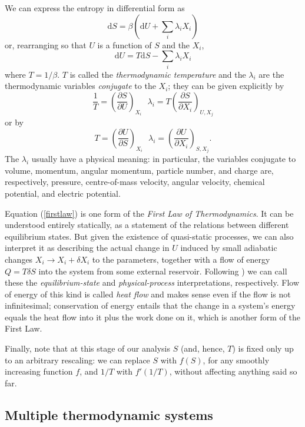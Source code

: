 \documentclass[12pt]{article}
\newcommand{\pbp}[2]{\ensuremath{\frac{\partial #1}{\partial #2}}}
\newcommand{\be}{\begin{equation}}
\newcommand{\ee}{\end{equation}}
\begin{document}
We can express the entropy in differential form as
\be
\mathrm{d}S = \beta\left(\mathrm{d}U + \sum_i \lambda_i X_i \right)
\ee
or, rearranging so that $U$ is a function of $S$ and the $X_i$,
\be\label{firstlaw}
\mathrm{d}U = T \mathrm{d}S - \sum_i \lambda_i X_i
\ee
where $T=1/\beta$. $T$ is called the \emph{thermodynamic temperature} and the $\lambda_i$ are the thermodynamic variables \emph{conjugate} to the $X_i$; they can be given explicitly by
\be
\frac{1}{T} = \left(\pbp{S}{U}\right)_{X_i}\,\,\,\, \lambda_i = T \left(\pbp{S}{X_i}\right)_{U,X_j}
\ee
or by
\be
T = \left(\pbp{U}{S}\right)_{X_i}\,\,\,\, \lambda_i = \left(\pbp{U}{X_i}\right)_{S,X_j}.
\ee
The $\lambda_i$ usually have a physical meaning: in particular, the variables conjugate to volume, momentum, angular momentum, particle number, and charge are, respectively, pressure, centre-of-mass velocity, angular velocity, chemical potential, and electric potential.

Equation (\ref{firstlaw}) is one form of the \emph{First Law of Thermodynamics}. It can be understood entirely statically, as a statement of the relations between different equilibrium states. But given the existence of quasi-static processes, we can also interpret it as describing the actual change in $U$ induced by small adiabatic changes $X_i \rightarrow X_i + \delta X_i$ to the parameters, together with a flow of energy $Q = T \delta S$ into the system from some external reservoir. Following ) we can call these the \emph{equilibrium-state} and \emph{physical-process} interpretations, respectively. Flow of energy of this kind is called \emph{heat flow} and makes sense even if the flow is not infinitesimal; conservation of energy entails that the change in a system's energy equals the heat flow into it plus the work done on it, which is another form of the First Law.

Finally, note that at this stage of our analysis $S$ (and, hence, $T$) is fixed only up to an arbitrary rescaling: we can replace $S$ with $f(S)$, for any smoothly increasing function $f$, and $1/T$ with $f'(1/T)$, without affecting anything said so far.

\subsection{Multiple thermodynamic systems}
\end{document}

